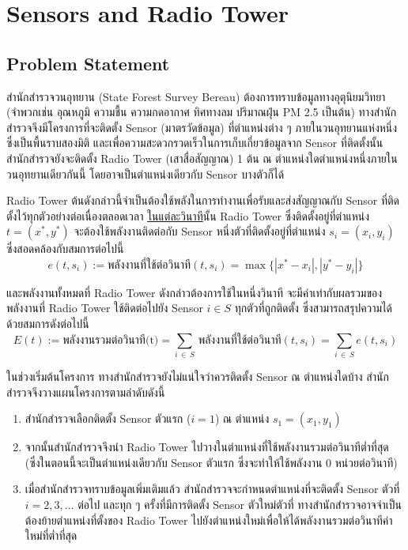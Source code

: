 \section{Sensors and Radio Tower}

\subsection{Problem Statement}

สำนักสำรวจวนอุทยาน (State Forest Survey Bereau) ต้องการทราบข้อมูลทางอุตุนิยมวิทยา (จำพวกเช่น อุณหภูมิ ความชื้น ความกดอากาศ ทิศทางลม ปริมาณฝุ่น PM 2.5 เป็นต้น) ทางสำนักสำรวจจึงมีโครงการที่จะติดตั้ง Sensor (มาตรวัดข้อมูล) ที่ตำแหน่งต่าง ๆ ภายในวนอุทยานแห่งหนึ่งซึ่งเป็นพื้นราบสองมิติ \;
และเพื่อความสะดวกรวดเร็วในการเก็บเกี่ยวข้อมูลจาก Sensor ที่ติดตั้งนั้น สำนักสำรวจยังจะติดตั้ง Radio Tower (เสาสื่อสัญญาณ) 1 ต้น ณ ตำแหน่งใดตำแหน่งหนึ่งภายในวนอุทยานเดียวกันนี้ โดยอาจเป็นตำแหน่งเดียวกับ Sensor บางตัวก็ได้ \;

Radio Tower ต้นดังกล่าวนี้จำเป็นต้องใช้พลังในการทำงานเพื่อรับและส่งสัญญาณกับ Sensor ที่ติดตั้งไว้ทุกตัวอย่างต่อเนื่องตลอดเวลา \;
\uline{ในแต่ละวินาที}นั้น Radio Tower ซึ่งติดตั้งอยู่ที่ตำแหน่ง $t = (x^*, y^*)$ จะต้องใช้พลังงานติดต่อกับ Sensor หนึ่งตัวที่ติดตั้งอยู่ที่ตำแหน่ง $s_i = (x_i, y_i)$ ซึ่งสอดคล้องกับสมการต่อไปนี้
\[
    e(t, s_i) := \text{พลังงานที่ใช้ต่อวินาที}(t, s_i) = \max\big\{ |x^* - x_i|, |y^* - y_i| \big\}
\]

\noindent
และพลังงานทั้งหมดที่ Radio Tower ดังกล่าวต้องการใช้ในหนึ่งวินาที จะมีค่าเท่ากับผลรวมของพลังงานที่ Radio Tower ใช้ติดต่อไปยัง Sensor $i \in S$ ทุกตัวที่ถูกติดตั้ง ซึ่งสามารถสรุปความได้ด้วยสมการดังต่อไปนี้
\[
    E(t) := \text{พลังงานรวมต่อวินาที(t)} = \sum_{i \,\in\, S} \,\text{พลังงานที่ใช้ต่อวินาที}(t, s_i) = \sum_{i \,\in\, S} e(t, s_i) 
\]

ในช่วงเริ่มต้นโครงการ ทางสำนักสำรวจยังไม่แน่ใจว่าควรติดตั้ง Sensor ณ ตำแหน่งใดบ้าง สำนักสำรวจจึงวางแผนโครงการตามลำดับดังนี้

\begin{enumerate}
    \item
        สำนักสำรวจเลือกติดตั้ง Sensor ตัวแรก ({\hrsp}$i = 1${\hrsp}) ณ ตำแหน่ง $s_1 = (x_1, y_1)$
    \item
        จากนั้นสำนักสำรวจจึงนำ Radio Tower ไปวางในตำแหน่งที่ใช้พลังงานรวมต่อวินาทีต่ำที่สุด 
        (ซึ่งในตอนนี้จะเป็นตำแหน่งเดียวกับ Sensor ตัวแรก ซึ่งจะทำให้ใช้พลังงาน 0 หน่วยต่อวินาที)
    \item  
        เมื่อสำนักสำรวจทราบข้อมูลเพิ่มเติมแล้ว สำนักสำรวจจะกำหนดตำแหน่งที่จะติดตั้ง Sensor ตัวที่ $i = 2, 3, \ldots$ ต่อไป \;
        และทุก ๆ ครั้งที่มีการติดตั้ง Sensor ตัวใหม่ตัวที่ ทางสำนักสำรวจอาจจำเป็นต้องย้ายตำแหน่งที่ตั้งของ Radio Tower ไปยังตำแหน่งใหม่เพื่อให้ได้พลังงานรวมต่อวินาทีค่าใหม่ที่ต่ำที่สุด
\end{enumerate}

